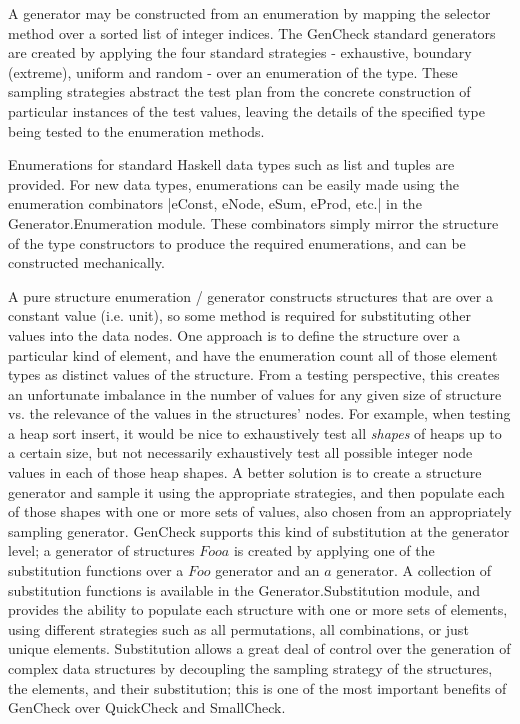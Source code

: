 A generator may be constructed from an enumeration by mapping the selector method
over a sorted list of integer indices.  The GenCheck standard generators are created
by applying the four standard strategies - exhaustive, boundary (extreme), uniform and random -
over an enumeration of the type.  These sampling strategies abstract the test plan from
the concrete construction of particular instances of the test values, leaving the details
of the specified type being tested to the enumeration methods.  

Enumerations for standard Haskell data types such as list and tuples are provided.
For new data types, enumerations can be easily made using the enumeration combinators 
|eConst, eNode, eSum, eProd, etc.| in the Generator.Enumeration module.
These combinators simply mirror the structure of the type constructors
to produce the required enumerations, and can be constructed mechanically.

A pure structure enumeration / generator constructs structures that are over a constant value
(i.e. unit), so some method is required for substituting other values into the data nodes.
One approach is to define the structure over a particular kind of element,
and have the enumeration count all of those element types as distinct values of the structure.
From a testing perspective, this creates an unfortunate imbalance in the number of values
for any given size of structure vs. the relevance of the values in the structures' nodes.
For example, when testing a heap sort insert, it would be nice to exhaustively test
all \emph{shapes} of heaps up to a certain size, but not necessarily exhaustively test
all possible integer node values in each of those heap shapes.  A better solution 
is to create a structure generator and sample it using the appropriate strategies,
and then populate each of those shapes with one or more sets of values, 
also chosen from an appropriately sampling generator.  GenCheck supports this
kind of substitution at the generator level; a generator of structures $Foo a$ is
created by applying one of the substitution functions over a $Foo$ generator and an $a$ generator.
A collection of substitution functions is available in the Generator.Substitution module,
and provides the ability to populate each structure with one or more sets of elements,
using different strategies such as all permutations, all combinations, or just unique elements.
Substitution allows a great deal of control over the generation of complex data structures
by decoupling the sampling strategy of the structures, the elements, and their substitution;
this is one of the most important benefits of GenCheck over QuickCheck and SmallCheck.

